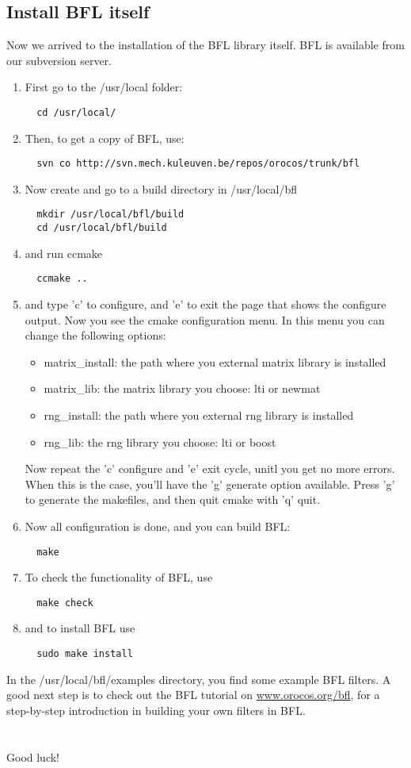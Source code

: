 \documentclass[a4paper,10pt]{article}
\begin{document}
\subsection{Install BFL itself}
Now we arrived to the installation of the BFL library itself. BFL is
available from our subversion server.
\begin{enumerate}
\item First go to the /usr/local folder:
\begin{verbatim}
  cd /usr/local/
\end{verbatim}
\item Then, to get a copy of BFL, use:
\begin{verbatim}
  svn co http://svn.mech.kuleuven.be/repos/orocos/trunk/bfl
\end{verbatim}
\item Now create and go to a build directory in /usr/local/bfl
\begin{verbatim}
  mkdir /usr/local/bfl/build
  cd /usr/local/bfl/build
\end{verbatim}
\item and run ccmake
\begin{verbatim}
  ccmake ..
\end{verbatim}
\item and type 'c' to configure, and 'e' to exit the page that shows
  the configure output. Now you see the cmake configuration menu. In
  this menu you can change the following options:
\begin{itemize}
\item matrix\_install: the path where you external matrix library is
  installed
\item matrix\_lib: the matrix library you choose: lti or newmat
\item rng\_install: the path where you external rng library is
  installed
\item rng\_lib: the rng library you choose: lti or boost
\end{itemize}
Now repeat the 'c' configure and 'e' exit cycle, unitl you get no more
errors. When this is the case, you'll have the 'g' generate option
available. Press 'g' to generate the makefiles, and then quit cmake
with 'q' quit.
\item Now all configuration is done, and you can build BFL:
\begin{verbatim}
  make 
\end{verbatim}	
\item To check the functionality of BFL, use
\begin{verbatim}
  make check
\end{verbatim}	
\item and to install BFL use
\begin{verbatim}
  sudo make install
\end{verbatim}
\end{enumerate}
In the /usr/local/bfl/examples directory, you find some example BFL
filters. A good next step is to check out the BFL tutorial on
\url{www.orocos.org/bfl}, for a step-by-step introduction in building
your own filters in BFL.
\\\\\\
Good luck!
\end{document}
